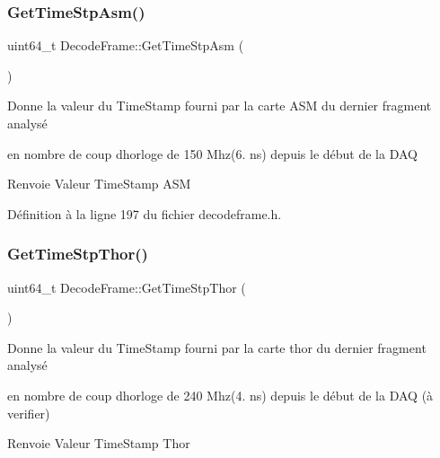 \mbox{\label{class_decode_frame_a8ceda592a6bd4ed68faaeeda53b433a0}} 
\subsubsection{\texorpdfstring{Get\+Time\+Stp\+Asm()}{GetTimeStpAsm()}}
{\footnotesize\ttfamily uint64\+\_\+t Decode\+Frame\+::\+Get\+Time\+Stp\+Asm (\begin{DoxyParamCaption}{ }\end{DoxyParamCaption})\hspace{0.3cm}{\ttfamily [inline]}}



Donne la valeur du Time\+Stamp fourni par la carte A\+SM du dernier fragment analysé 

en nombre de coup d\textquotesingle{}horloge de 150 Mhz(6. ns) depuis le début de la D\+AQ \begin{DoxyReturn}{Renvoie}
Valeur Time\+Stamp A\+SM 
\end{DoxyReturn}


Définition à la ligne 197 du fichier decodeframe.\+h.

\mbox{\label{class_decode_frame_a81f93958ad2e294cb165ca1fda16e6d5}} 
\subsubsection{\texorpdfstring{Get\+Time\+Stp\+Thor()}{GetTimeStpThor()}}
{\footnotesize\ttfamily uint64\+\_\+t Decode\+Frame\+::\+Get\+Time\+Stp\+Thor (\begin{DoxyParamCaption}{ }\end{DoxyParamCaption})\hspace{0.3cm}{\ttfamily [inline]}}



Donne la valeur du Time\+Stamp fourni par la carte thor du dernier fragment analysé 

en nombre de coup d\textquotesingle{}horloge de 240 Mhz(4. ns) depuis le début de la D\+AQ (à verifier) \begin{DoxyReturn}{Renvoie}
Valeur Time\+Stamp Thor 
\end{DoxyReturn}



